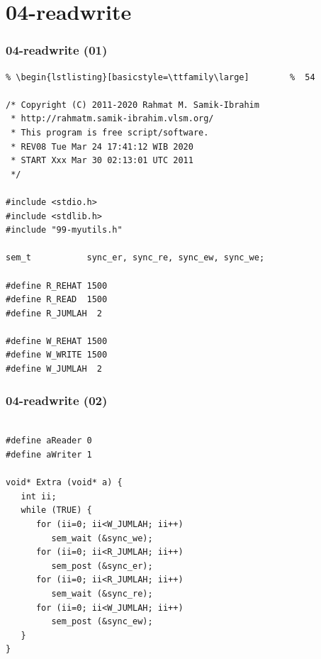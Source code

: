 \documentclass[xcolor=table, notheorems, hyperref={pdfpagelabels=false}]{beamer}
\begin{document}
\section{04-readwrite}
\begin{frame}[fragile]
\frametitle{04-readwrite (01)}
\begin{lstlisting}[basicstyle=\ttfamily\footnotesize] %  72
% \begin{lstlisting}[basicstyle=\ttfamily\small]        %  65
% \begin{lstlisting}[basicstyle=\ttfamily\large]        %  54

/* Copyright (C) 2011-2020 Rahmat M. Samik-Ibrahim
 * http://rahmatm.samik-ibrahim.vlsm.org/
 * This program is free script/software. 
 * REV08 Tue Mar 24 17:41:12 WIB 2020
 * START Xxx Mar 30 02:13:01 UTC 2011
 */

#include <stdio.h>
#include <stdlib.h>
#include "99-myutils.h"

sem_t           sync_er, sync_re, sync_ew, sync_we;

#define R_REHAT 1500
#define R_READ  1500
#define R_JUMLAH  2

#define W_REHAT 1500
#define W_WRITE 1500
#define W_JUMLAH  2

\end{lstlisting}
\end{frame}

\begin{frame}[fragile]
\frametitle{04-readwrite (02)}
\begin{lstlisting}[basicstyle=\ttfamily\large]        %  54

#define aReader 0
#define aWriter 1

void* Extra (void* a) {
   int ii;
   while (TRUE) {
      for (ii=0; ii<W_JUMLAH; ii++)
         sem_wait (&sync_we);
      for (ii=0; ii<R_JUMLAH; ii++)
         sem_post (&sync_er);
      for (ii=0; ii<R_JUMLAH; ii++)
         sem_wait (&sync_re);
      for (ii=0; ii<W_JUMLAH; ii++)
         sem_post (&sync_ew);
   }
}

\end{lstlisting}
\end{frame}
\end{document}
